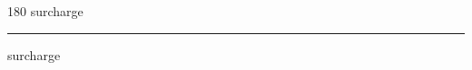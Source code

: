 
\begin{frame}
\begin{center}
\begin{turn}{180}
{\fontsize{2.5cm}{1em}\selectfont surcharge}
\end{turn}
\vspace{1em}\par  
\hrule
\vspace{1em}\par  
{\fontsize{2.5cm}{1em}\selectfont surcharge}
\end{center}
\end{frame}
